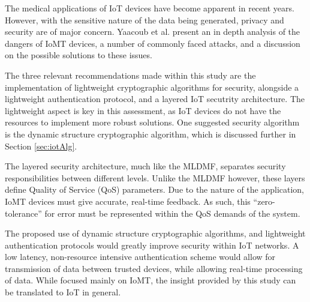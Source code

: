 The medical applications of IoT devices have become apparent in recent years.
However, with the sensitive nature of the data being generated, privacy and
security are of major concern. Yaacoub et al. present an in depth analysis of
the dangers of IoMT devices, a number of commonly faced attacks, and a
discussion on the possible solutions to these issues\cite{iomt_2019}.

The three relevant recommendations made within this study are the implementation
of lightweight cryptographic algorithms for security, alongside a lightweight
authentication protocol, and a layered IoT secutrity architecture. The lightweight
aspect is key in this assessment, as IoT devices do not have the resources to
implement more robust solutions. One suggested security algorithm is the dynamic
structure cryptographic algorithm, which is discussed further in Section
\ref{sec:iotAlg}.

The layered security architecture, much like the MLDMF, separates security
responsibilities between different levels. Unlike the MLDMF however, these
layers define Quality of Service (QoS) parameters. Due to the nature of the
application, IoMT devices must give accurate, real-time feedback. As such, this
``zero-tolerance'' for error must be represented within the QoS demands of the
system.

The proposed use of dynamic structure cryptographic algorithms, and lightweight
authentication protocols would greatly improve security within IoT networks. A
low latency, non-resource intensive authentication scheme would allow for
transmission of data between trusted devices, while allowing real-time
processing of data. While focused mainly on IoMT, the insight provided by this
study can be translated to IoT in general.
